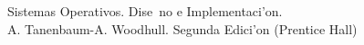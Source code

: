 \begin{thebibliography}{99}
	 Sistemas Operativos. Dise~no e Implementaci'on.\\  A. Tanenbaum-A. Woodhull. Segunda Edici'on (Prentice Hall) 
\end{thebibliography}
